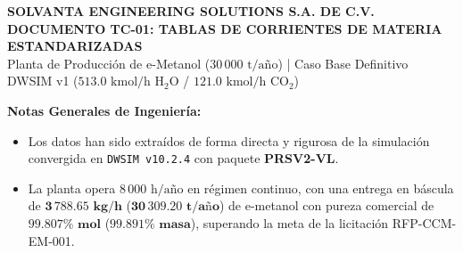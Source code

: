 \documentclass[10pt,letterpaper]{article}
\begin{document}
\begin{center}
{\large \textbf{SOLVANTA ENGINEERING SOLUTIONS S.A. DE C.V.}}\\[0.15cm]
{\Large \textbf{\color{navyblue} DOCUMENTO TC-01: TABLAS DE CORRIENTES DE MATERIA ESTANDARIZADAS}}\\[0.1cm]
{\small Planta de Producción de e-Metanol ($30\,000\text{ t/año}$) | Caso Base Definitivo DWSIM v1 ($513.0\text{ kmol/h }\text{H}_2\text{O}$ / $121.0\text{ kmol/h }\text{CO}_2$)}
\end{center}

\vspace{0.1cm}
\noindent\textbf{Notas Generales de Ingeniería:}
\begin{itemize}
    \setlength{\itemsep}{0pt}
    \setlength{\parskip}{0pt}
    \item Los datos han sido extraídos de forma directa y rigurosa de la simulación convergida en \texttt{DWSIM v10.2.4} con paquete \textbf{PRSV2-VL}.
    \item La planta opera $8\,000\text{ h/año}$ en régimen continuo, con una entrega en báscula de $\mathbf{3\,788.65\text{ kg/h}}$ ($\mathbf{30\,309.20\text{ t/año}}$) de e-metanol con pureza comercial de $\mathbf{99.807\%\text{ mol}}$ ($\mathbf{99.891\%\text{ masa}}$), superando la meta de la licitación RFP-CCM-EM-001.
\end{itemize}
\end{document}
